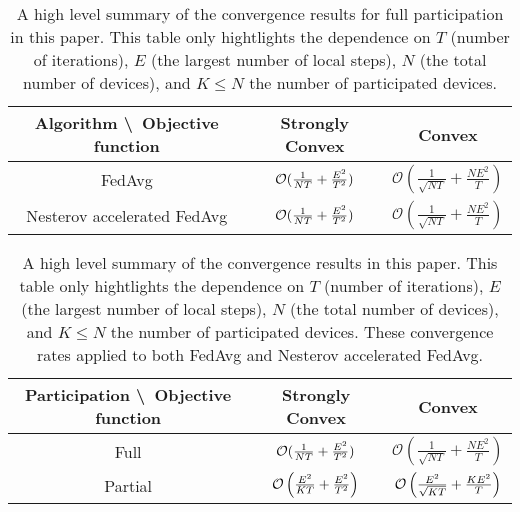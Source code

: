 



\begin{table}[h!]
\centering
\begin{tabular}{|c|c|c|}\hline 
	Algorithm \textbackslash\  Objective function        & Strongly Convex        & Convex \\ \hline \hline
	FedAvg                         & ${\mathcal{O}}(\frac{1}{NT}+\frac{E^{2}}{T^{2}})$    &  $\mathcal{O}\left(\frac{1}{\sqrt{NT}}+\frac{NE^{2}}{T}\right)$       \\ \hline
	Nesterov accelerated FedAvg    & ${\mathcal{O}}(\frac{1}{NT}+\frac{E^{2}}{T^{2}})$    & $\mathcal{O}\left(\frac{1}{\sqrt{NT}}+\frac{NE^{2}}{T}\right)$       \\ \hline
\end{tabular}
\caption{A high level summary of the convergence results for full participation in this paper. This table only hightlights the
dependence on $T$ (number of iterations), $E$ (the largest number of local steps), $N$ (the total number of devices), and $K\leq N$ the number of participated devices.}
\label{tb:convergenceratev1}
\end{table}

\begin{table}[h!]
\centering
\begin{tabular}{|c|c|c|}\hline 
	Participation \textbackslash\ Objective function            & Strongly Convex        & Convex \\ \hline \hline
	Full                         & ${\mathcal{O}}(\frac{1}{NT}+\frac{E^{2}}{T^{2}})$    &  $\mathcal{O}\left(\frac{1}{\sqrt{NT}}+\frac{NE^{2}}{T}\right)$       \\ \hline
	Partial                      &  ${\mathcal{O}}\left(\frac{E^{2}}{KT}+\frac{E^{2}}{T^{2}}\right)$   &  ${\mathcal{O}}\left(\frac{E^2}{\sqrt{KT}}+\frac{KE^2}{T} \right)$      \\ \hline
\end{tabular}
\caption{A high level summary of the convergence results in this paper. This table only hightlights the
dependence on $T$ (number of iterations), $E$ (the largest number of local steps), $N$ (the total number of devices), and $K\leq N$ the number of participated devices.
These convergence rates applied to both FedAvg and Nesterov accelerated FedAvg.}
\label{tb:convergenceratev2}
\end{table}


